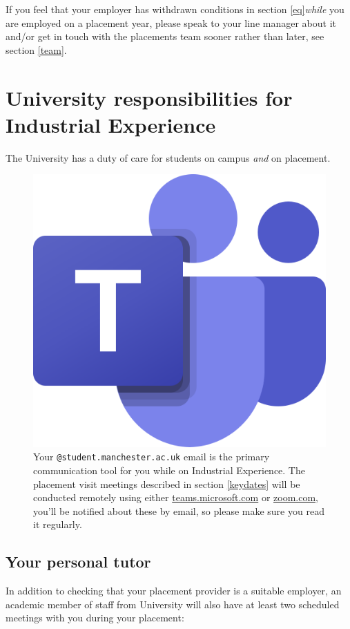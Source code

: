 \documentclass[
]{book}
\begin{document}
If you feel that your employer has withdrawn conditions in section \ref{eq}\emph{while} you are employed on a placement year, please speak to your line manager about it and/or get in touch with the placements team sooner rather than later, see section \ref{team}.

\chapter{University responsibilities for Industrial Experience}\label{university}

The University has a duty of care for students on campus \emph{and} on placement.

\begin{figure}

{\centering \includegraphics[width=0.5\linewidth]{images/msteams} 

}

\caption{Your \texttt{@student.manchester.ac.uk} email is the primary communication tool for you while on Industrial Experience. The placement visit meetings described in section \ref{keydates} will be conducted remotely using either \href{https://teams.microsoft.com}{teams.microsoft.com} or \href{https://www.zoom.com}{zoom.com}, you'll be notified about these by email, so please make sure you read it regularly.}\label{fig:teams-fig}
\end{figure}



\section{Your personal tutor}\label{tutor}

In addition to checking that your placement provider is a suitable employer, an academic member of staff from University will also have at least two scheduled meetings with you during your placement:
\end{document}
